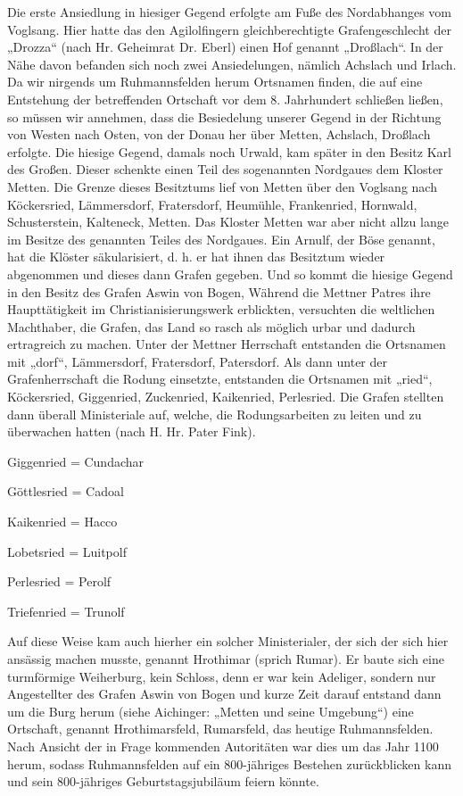 \documentclass[12pt,a4paper]{book}
\begin{document}
Die erste Ansiedlung in hiesiger Gegend erfolgte am Fuße des
Nordabhanges vom Voglsang. Hier hatte das den Agilolfingern
gleichberechtigte Grafengeschlecht der „Drozza“ (nach Hr. Geheimrat Dr.
Eberl) einen Hof genannt „Droßlach“. In der Nähe davon befanden sich
noch zwei Ansiedelungen, nämlich Achslach und Irlach. Da wir nirgends um
Ruhmannsfelden herum Ortsnamen finden, die auf eine Entstehung der
betreffenden Ortschaft vor dem 8. Jahrhundert schließen ließen, so
müssen wir annehmen, dass die Besiedelung unserer Gegend in der Richtung
von Westen nach Osten, von der Donau her über Metten, Achslach, Droßlach
erfolgte. Die hiesige Gegend, damals noch Urwald, kam später in den
Besitz Karl des Großen. Dieser schenkte einen Teil des sogenannten
Nordgaues dem Kloster Metten. Die Grenze dieses Besitztums lief von
Metten über den Voglsang nach Köckersried, Lämmersdorf, Fratersdorf,
Heumühle, Frankenried, Hornwald, Schusterstein, Kalteneck, Metten. Das
Kloster Metten war aber nicht allzu lange im Besitze des genannten
Teiles des Nordgaues. Ein Arnulf, der Böse genannt, hat die Klöster
säkularisiert, d. h. er hat ihnen das Besitztum wieder abgenommen und
dieses dann Grafen gegeben. Und so kommt die hiesige Gegend in den
Besitz des Grafen Aswin von Bogen, Während die Mettner Patres ihre
Haupttätigkeit im Christianisierungswerk erblickten, versuchten die
weltlichen Machthaber, die Grafen, das Land so rasch als möglich urbar
und dadurch ertragreich zu machen. Unter der Mettner Herrschaft
entstanden die Ortsnamen mit „dorf“, Lämmersdorf, Fratersdorf,
Patersdorf. Als dann unter der Grafenherrschaft die Rodung einsetzte,
entstanden die Ortsnamen mit „ried“, Köckersried, Giggenried,
Zuckenried, Kaikenried, Perlesried. Die Grafen stellten dann überall
Ministeriale auf, welche, die Rodungsarbeiten zu leiten und zu
überwachen hatten (nach H. Hr. Pater Fink).

Giggenried  = Cundachar

Göttlesried = Cadoal

Kaikenried = Hacco

Lobetsried = Luitpolf

Perlesried = Perolf

Triefenried = Trunolf

Auf diese Weise kam auch hierher ein solcher Ministerialer, der sich der
sich hier ansässig machen musste, genannt Hrothimar (sprich Rumar). Er
baute sich eine turmförmige Weiherburg, kein Schloss, denn er war kein
Adeliger, sondern nur Angestellter des Grafen Aswin von Bogen und kurze
Zeit darauf entstand dann um die Burg herum (siehe Aichinger: „Metten
und seine Umgebung“) eine Ortschaft, genannt Hrothimarsfeld, Rumarsfeld,
das heutige Ruhmannsfelden. Nach Ansicht der in Frage kommenden
Autoritäten war dies um das Jahr 1100 herum, sodass Ruhmannsfelden auf
ein 800-jähriges Bestehen zurückblicken kann und sein 800-jähriges
Geburtstagsjubiläum feiern könnte.
\end{document}
